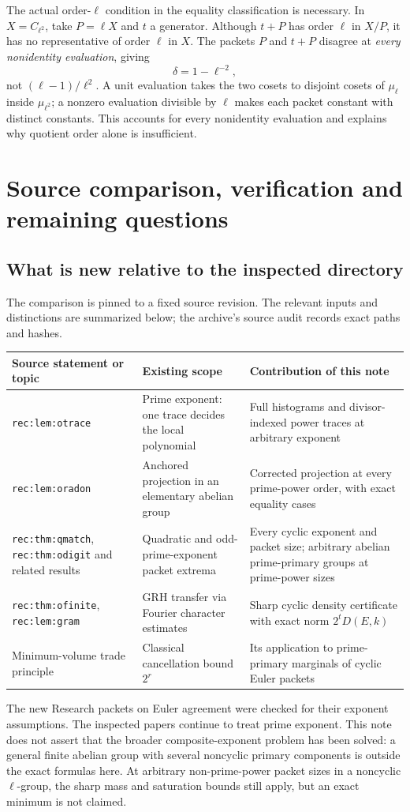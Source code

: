 \documentclass[11pt]{article}
\theoremstyle{definition}
\theoremstyle{remark}
\begin{document}
The actual order-$\ell$ condition in the equality classification is necessary. In $X=C_{\ell^2}$, take $P=\ell X$ and $t$ a generator. Although $t+P$ has order $\ell$ in $X/P$, it has no representative of order $\ell$ in $X$. The packets $P$ and $t+P$ disagree at \emph{every nonidentity evaluation}, giving
\[
 \delta=1-\ell^{-2},
\]
not $(\ell-1)/\ell^2$. A unit evaluation takes the two cosets to disjoint cosets of $\mu_\ell$ inside $\mu_{\ell^2}$; a nonzero evaluation divisible by $\ell$ makes each packet constant with distinct constants. This accounts for every nonidentity evaluation and explains why quotient order alone is insufficient.

\section{Source comparison, verification and remaining questions}\label{sec:validation}
\subsection{What is new relative to the inspected directory}
The comparison is pinned to a fixed source revision. The relevant inputs and distinctions are summarized below; the archive's source audit records exact paths and hashes.
\begin{center}\small
\begin{tabular}{@{}p{.28\linewidth}p{.31\linewidth}p{.33\linewidth}@{}}\toprule
Source statement or topic & Existing scope & Contribution of this note\\\midrule
\texttt{rec:lem:otrace} & Prime exponent: one trace decides the local polynomial & Full histograms and divisor-indexed power traces at arbitrary exponent\\[3pt]
\texttt{rec:lem:oradon} & Anchored projection in an elementary abelian group & Corrected projection at every prime-power order, with exact equality cases\\[3pt]
\texttt{rec:thm:qmatch}, \texttt{rec:thm:odigit} and related results & Quadratic and odd-prime-exponent packet extrema & Every cyclic exponent and packet size; arbitrary abelian prime-primary groups at prime-power sizes\\[3pt]
\texttt{rec:thm:ofinite}, \texttt{rec:lem:gram} & GRH transfer via Fourier character estimates & Sharp cyclic density certificate with exact norm $2^tD(E,k)$\\[3pt]
Minimum-volume trade principle & Classical cancellation bound $2^r$ & Its application to prime-primary marginals of cyclic Euler packets\\\bottomrule
\end{tabular}
\end{center}
The new Research packets on Euler agreement were checked for their exponent assumptions. The inspected papers continue to treat prime exponent. This note does not assert that the broader composite-exponent problem has been solved: a general finite abelian group with several noncyclic primary components is outside the exact formulas here. At arbitrary non-prime-power packet sizes in a noncyclic $\ell$-group, the sharp mass and saturation bounds still apply, but an exact minimum is not claimed.
\end{document}
